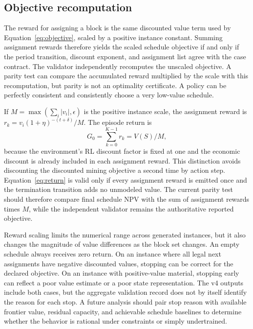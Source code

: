 \documentclass[11pt]{article}
\begin{document}
\subsection{Objective recomputation}
The reward for assigning a block is the same discounted value term used by Equation~\ref{eq:objective}, scaled by a positive instance constant. Summing assignment rewards therefore yields the scaled schedule objective if and only if the period transition, discount exponent, and assignment list agree with the case contract. The validator independently recomputes the unscaled objective. A parity test can compare the accumulated reward multiplied by the scale with this recomputation, but parity is not an optimality certificate. A policy can be perfectly consistent and consistently choose a very low-value schedule.

If $M=\max(\sum_i|v_i|,\epsilon)$ is the positive instance scale, the assignment reward is $r_k=v_i(1+\eta)^{-(t+\delta)}/M$. The episode return is
\begin{equation}
G_0=\sum_{k=0}^{K-1}r_k=V(S)/M,
\label{eq:return}
\end{equation}
because the environment's RL discount factor is fixed at one and the economic discount is already included in each assignment reward. This distinction avoids discounting the discounted mining objective a second time by action step. Equation~\ref{eq:return} is valid only if every assignment reward is emitted once and the termination transition adds no unmodeled value. The current parity test should therefore compare final schedule NPV with the sum of assignment rewards times $M$, while the independent validator remains the authoritative reported objective.

Reward scaling limits the numerical range across generated instances, but it also changes the magnitude of value differences as the block set changes. An empty schedule always receives zero return. On an instance where all legal next assignments have negative discounted values, stopping can be correct for the declared objective. On an instance with positive-value material, stopping early can reflect a poor value estimate or a poor state representation. The v4 outputs include both cases, but the aggregate validation record does not by itself identify the reason for each stop. A future analysis should pair stop reason with available frontier value, residual capacity, and achievable schedule baselines to determine whether the behavior is rational under constraints or simply undertrained.
\end{document}
